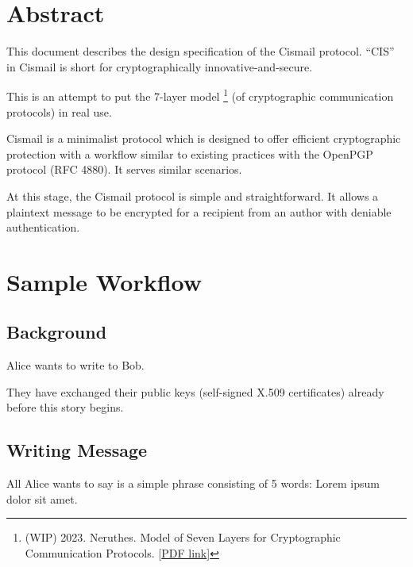 \documentclass[a4paper,11pt]{article}
\begin{document}

\fulldoctitle


\section*{Abstract}

This document describes the design specification of the Cismail protocol.
``CIS'' in Cismail is short for cryptographically innovative-and-secure.

This is an attempt to put the 7-layer model%
\footnote{(WIP) 2023. Neruthes. Model of Seven Layers for Cryptographic Communication Protocols. [\href{https://pub-714f8d634e8f451d9f2fe91a4debfa23.r2.dev/keep/ntexdb/note-20230206-crypt-suite.pdf--6c7cbbc319948e0dd9e2ae6b5fcdfa27.pdf}{PDF link}]}
(of cryptographic communication protocols) in real use.

Cismail is a minimalist protocol which is designed to offer efficient cryptographic protection
with a workflow similar to existing practices with the OpenPGP protocol (RFC 4880).
It serves similar scenarios.

At this stage, the Cismail protocol is simple and straightforward.
It allows a plaintext message to be encrypted for a recipient from an author with deniable authentication.




\section{Sample Workflow}

\subsection{Background}

Alice wants to write to Bob.

They have exchanged their public keys (self-signed X.509 certificates) already before this story begins.

\subsection{Writing Message}

All Alice wants to say is a simple phrase consisting of 5 words: Lorem ipsum dolor sit amet.
\end{document}

